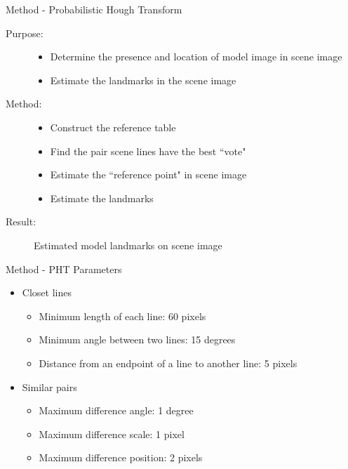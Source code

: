 \documentclass{beamer}
\begin{document}
\begin{frame}{Method - Probabilistic Hough Transform}
	\begin{description}
		\item[Purpose:]
			\begin{itemize}
				\item Determine the presence and location of model image in scene image
				\item Estimate the landmarks in the scene image
			\end{itemize}
		\item[Method:]
		\begin{itemize}
			\item Construct the reference table
			\item Find the pair scene lines have the best ``vote"
			\item Estimate the ``reference point" in scene image
			\item Estimate the landmarks
		\end{itemize}
		\item[Result:] Estimated model landmarks on scene image
	\end{description}
\end{frame}
\begin{frame}{Method - PHT Parameters}
	\begin{itemize}
		\item Closet lines
			\begin{itemize}
				\item Minimum length of each line: 60 pixels
				\item Minimum angle between two lines: 15 degrees
				\item Distance from an endpoint of a line to another line: 5 pixels
			\end{itemize}
		\item Similar pairs		
			\begin{itemize}
				\item Maximum difference angle: 1 degree
				\item Maximum difference scale: 1 pixel
				\item Maximum difference position: 2 pixels
			\end{itemize}
	\end{itemize}
\end{frame}
\end{document}
